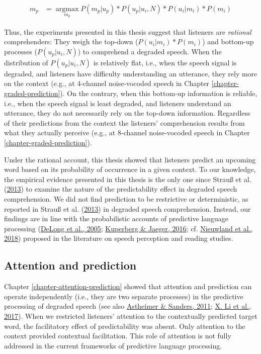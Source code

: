 \documentclass[a4paper, nobind]{templates/ociamthesis}
\begin{document}
\begin{align*} 
\hat{m_p} &= \mathop{\mathrm{argmax}}\limits_{m_p} P(m_p | u_p) * P(u_p|u_i, N) * P(u_i | m_i) * P(m_i)
\end{align*}

Thus, the experiments presented in this thesis suggest that listeners are \emph{rational} comprehenders:
They weigh the top-down (\(P(u_i | m_i) * P(m_i)\)) and bottom-up processes (\(P(u_p|u_i, N)\)) to comprehend a degraded speech.
When the distribution of \(P(u_p|u_i, N)\) is relatively flat, i.e.,
when the speech signal is degraded, and listeners have difficulty understanding an utterance,
they rely more on the context (e.g., at 4-channel noise-vocoded speech in Chapter \ref{chapter-graded-prediction}).
On the contrary, when this bottom-up information is reliable, i.e.,
when the speech signal is least degraded, and listeners understand an utterance,
they do not necessarily rely on the top-down information.
Regardless of their predictions from the context
the listeners' comprehension results from what they actually perceive (e.g., at 8-channel noise-vocoded speech in Chapter \ref{chapter-graded-prediction}).

Under the rational account, this thesis showed that listeners predict an upcoming word based on its probability of occurrence in a given context.
To our knowledge, the empirical evidence presented in this thesis is the only one since Strauß et al. (\protect\hyperlink{ref-Strauss2013}{2013}) to examine the nature of the predictability effect in degraded speech comprehension.
We did not find prediction to be restrictive or deterministic, as reported in Strauß et al. (\protect\hyperlink{ref-Strauss2013}{2013}) in degraded speech comprehension.
Instead, our findings are in line with the probabilistic accounts of predictive language processing (\protect\hyperlink{ref-Delong2005}{DeLong et al., 2005}; \protect\hyperlink{ref-Kuperberg2016}{Kuperberg \& Jaeger, 2016}; cf. \protect\hyperlink{ref-Nieuwland2018}{Nieuwland et al., 2018}) proposed in the literature on speech perception and reading studies.

\hypertarget{attention-and-prediction}{%
\subsection{Attention and prediction}\label{attention-and-prediction}}

Chapter \ref{chapter-attention-prediction} showed that attention and prediction can operate independently (i.e., they are two separate processes) in the predictive processing of degraded speech (see also \protect\hyperlink{ref-Astheimer2011}{Astheimer \& Sanders, 2011}; \protect\hyperlink{ref-Li2017}{X. Li et al., 2017}).
When we restricted listeners' attention to the contextually predicted target word, the facilitatory effect of predictability was absent.
Only attention to the context provided contextual facilitation.
This role of attention is not fully addressed in the current frameworks of predictive language processing.
\end{document}

